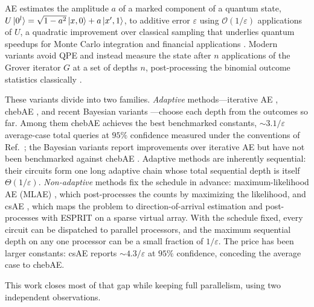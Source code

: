 \documentclass[%
 twocolumn,
 amsmath,amssymb,
prx,
longbibliography
]{revtex4-2}
\begin{document}
\Ac{AE} \cite{brassard2002quantum} estimates the amplitude $a$ of a marked component of a quantum state, $U\ket{0^l} = \sqrt{1-a^2}\ket{x,0} + a\ket{x',1}$, to additive error $\varepsilon$ using $\mathcal{O}(1/\varepsilon)$ applications of $U$, a quadratic improvement over classical sampling that underlies quantum speedups for Monte Carlo integration \cite{montanaro2015quantum} and financial applications \cite{rebentrost2018quantum, Stamatopoulos2020optionpricingusing, Chakrabarti2021thresholdquantum}. Modern variants avoid \ac{QPE} and instead measure the state after $n$ applications of the Grover iterator $G$ at a set of depths $n$, post-processing the binomial outcome statistics classically \cite{suzuki2020amplitude, aaronson2020quantum, grinko2021iterative, venkateswaran2021quantum, giurgica2022low, Rall2023amplitudeestimation}.

These variants divide into two families. \emph{Adaptive} methods---iterative \ac{AE} \cite{grinko2021iterative}, chebAE \cite{Rall2023amplitudeestimation}, and recent Bayesian variants \cite{ramoa2025bayesian, li2026biqae}---choose each depth from the outcomes so far. Among them chebAE achieves the best benchmarked constants, $\sim 3.1/\varepsilon$ average-case total queries at $95\%$ confidence measured under the conventions of Ref.~\cite{labib2024csae}; the Bayesian variants report improvements over iterative \ac{AE} but have not been benchmarked against chebAE \cite{li2026biqae}. Adaptive methods are inherently sequential: their circuits form one long adaptive chain whose total sequential depth is itself $\Theta(1/\varepsilon)$. \emph{Non-adaptive} methods fix the schedule in advance: maximum-likelihood \ac{AE} (MLAE) \cite{suzuki2020amplitude}, which post-processes the counts by maximizing the likelihood, and csAE \cite{labib2024csae}, which maps the problem to direction-of-arrival estimation and post-processes with ESPRIT on a sparse virtual array. With the schedule fixed, every circuit can be dispatched to parallel processors, and the maximum sequential depth on any one processor can be a small fraction of $1/\varepsilon$. The price has been larger constants: csAE reports $\sim 4.3/\varepsilon$ at $95\%$ confidence, conceding the average case to chebAE.

This work closes most of that gap while keeping full parallelism, using two independent observations.
\end{document}
